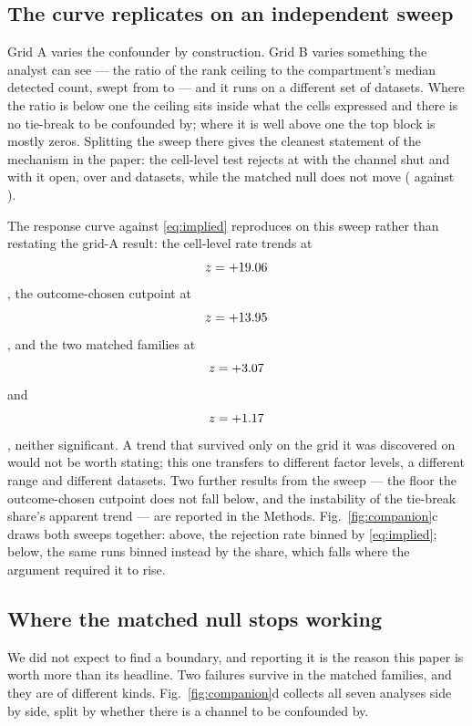 \documentclass[11pt]{article}
\begin{document}
\subsection{The curve replicates on an independent sweep}
\label{sec:regime}

Grid A varies the confounder by construction. Grid B varies something the
analyst can see --- the ratio of the rank ceiling to the compartment's median
detected count, swept from \gridBRatioMin{} to \gridBRatioMax{} --- and it runs
on a different set of \gridBRuns{} datasets. Where the ratio is below one the
ceiling sits inside what the cells expressed and there is no tie-break to be
confounded by; where it is well above one the top block is mostly zeros.
Splitting the sweep there gives the cleanest statement of the mechanism in the
paper: the cell-level test rejects at \gridBChanClosedCellcor{} with the channel
shut and \gridBChanOpenCellcor{} with it open, over \gridBChanClosedN{} and
\gridBChanOpenN{} datasets, while the matched null does not move
(\gridBChanClosedExpr{} against \gridBChanOpenExpr{}).

The response curve against \eqref{eq:implied} reproduces on this sweep rather
than restating the grid-A result: the cell-level rate trends at
$$z=+19.06$$, the outcome-chosen cutpoint at
$$z=+13.95$$, and the two matched families at
$$z=+3.07$$ and $$z=+1.17$$, neither significant. A
trend that survived only on the grid it was discovered on would not be worth
stating; this one transfers to different factor levels, a different range and
different datasets. Two further results from the sweep --- the floor the
outcome-chosen cutpoint does not fall below, and the instability of the
tie-break share's apparent trend --- are reported in the Methods.
Fig.~\ref{fig:companion}c draws both sweeps together: above, the rejection rate
binned by \eqref{eq:implied}; below, the same runs binned instead by the share,
which falls where the argument required it to rise.

\subsection{Where the matched null stops working}
\label{sec:boundary}

We did not expect to find a boundary, and reporting it is the reason this paper
is worth more than its headline. Two failures survive in the matched families,
and they are of different kinds.
Fig.~\ref{fig:companion}d collects all seven analyses side by side, split by
whether there is a channel to be confounded by.
\end{document}

